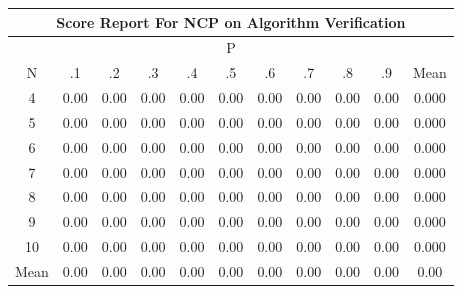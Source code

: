 \documentclass[11pt,a4paper]{report}
\begin{document}
\begin{longtable}{ | c || c | c | c | c | c | c | c | c | c || c |}
\hline
\multicolumn{11}{|c|}{ Score Report For NCP on Algorithm Verification} \\
\hline
\multicolumn{11}{|c|}{ P } \\
\hline
N & .1 & .2 & .3 & .4 & .5 & .6 & .7 & .8 & .9 & Mean\\
 \hline
 \hline
 \endhead
  4 &  \cellcolor[HTML]{FFFFFF} 0.00 &  \cellcolor[HTML]{FFFFFF} 0.00 &  \cellcolor[HTML]{FFFFFF} 0.00 &  \cellcolor[HTML]{FFFFFF} 0.00 &  \cellcolor[HTML]{FFFFFF} 0.00 &  \cellcolor[HTML]{FFFFFF} 0.00 &  \cellcolor[HTML]{FFFFFF} 0.00 &  \cellcolor[HTML]{FFFFFF} 0.00 &  \cellcolor[HTML]{FFFFFF} 0.00 & 0.000 \\
  5 &  \cellcolor[HTML]{FFFFFF} 0.00 &  \cellcolor[HTML]{FFFFFF} 0.00 &  \cellcolor[HTML]{FFFFFF} 0.00 &  \cellcolor[HTML]{FFFFFF} 0.00 &  \cellcolor[HTML]{FFFFFF} 0.00 &  \cellcolor[HTML]{FFFFFF} 0.00 &  \cellcolor[HTML]{FFFFFF} 0.00 &  \cellcolor[HTML]{FFFFFF} 0.00 &  \cellcolor[HTML]{FFFFFF} 0.00 & 0.000 \\
  6 &  \cellcolor[HTML]{FFFFFF} 0.00 &  \cellcolor[HTML]{FFFFFF} 0.00 &  \cellcolor[HTML]{FFFFFF} 0.00 &  \cellcolor[HTML]{FFFFFF} 0.00 &  \cellcolor[HTML]{FFFFFF} 0.00 &  \cellcolor[HTML]{FFFFFF} 0.00 &  \cellcolor[HTML]{FFFFFF} 0.00 &  \cellcolor[HTML]{FFFFFF} 0.00 &  \cellcolor[HTML]{FFFFFF} 0.00 & 0.000 \\
  7 &  \cellcolor[HTML]{FFFFFF} 0.00 &  \cellcolor[HTML]{FFFFFF} 0.00 &  \cellcolor[HTML]{FFFFFF} 0.00 &  \cellcolor[HTML]{FFFFFF} 0.00 &  \cellcolor[HTML]{FFFFFF} 0.00 &  \cellcolor[HTML]{FFFFFF} 0.00 &  \cellcolor[HTML]{FFFFFF} 0.00 &  \cellcolor[HTML]{FFFFFF} 0.00 &  \cellcolor[HTML]{FFFFFF} 0.00 & 0.000 \\
  8 &  \cellcolor[HTML]{FFFFFF} 0.00 &  \cellcolor[HTML]{FFFFFF} 0.00 &  \cellcolor[HTML]{FFFFFF} 0.00 &  \cellcolor[HTML]{FFFFFF} 0.00 &  \cellcolor[HTML]{FFFFFF} 0.00 &  \cellcolor[HTML]{FFFFFF} 0.00 &  \cellcolor[HTML]{FFFFFF} 0.00 &  \cellcolor[HTML]{FFFFFF} 0.00 &  \cellcolor[HTML]{FFFFFF} 0.00 & 0.000 \\
  9 &  \cellcolor[HTML]{FFFFFF} 0.00 &  \cellcolor[HTML]{FFFFFF} 0.00 &  \cellcolor[HTML]{FFFFFF} 0.00 &  \cellcolor[HTML]{FFFFFF} 0.00 &  \cellcolor[HTML]{FFFFFF} 0.00 &  \cellcolor[HTML]{FFFFFF} 0.00 &  \cellcolor[HTML]{FFFFFF} 0.00 &  \cellcolor[HTML]{FFFFFF} 0.00 &  \cellcolor[HTML]{FFFFFF} 0.00 & 0.000 \\
  10 &  \cellcolor[HTML]{FFFFFF} 0.00 &  \cellcolor[HTML]{FFFFFF} 0.00 &  \cellcolor[HTML]{FFFFFF} 0.00 &  \cellcolor[HTML]{FFFFFF} 0.00 &  \cellcolor[HTML]{FFFFFF} 0.00 &  \cellcolor[HTML]{FFFFFF} 0.00 &  \cellcolor[HTML]{FFFFFF} 0.00 &  \cellcolor[HTML]{FFFFFF} 0.00 &  \cellcolor[HTML]{FFFFFF} 0.00 & 0.000 \\
 \hline
 \hline
Mean &  \cellcolor[HTML]{FFFFFF} 0.00 &  \cellcolor[HTML]{FFFFFF} 0.00 &  \cellcolor[HTML]{FFFFFF} 0.00 &  \cellcolor[HTML]{FFFFFF} 0.00 &  \cellcolor[HTML]{FFFFFF} 0.00 &  \cellcolor[HTML]{FFFFFF} 0.00 &  \cellcolor[HTML]{FFFFFF} 0.00 &  \cellcolor[HTML]{FFFFFF} 0.00 &  \cellcolor[HTML]{FFFFFF} 0.00 &  \cellcolor[HTML]{FFFFFF} 0.00
\end{longtable}
\end{document}
